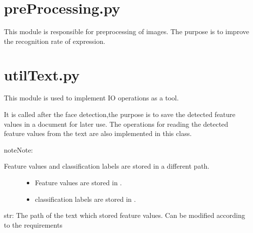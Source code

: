\documentclass[letterpaper,10pt,english]{sphinxmanual}
\begin{document}
\section{preProcessing.py}
\label{Documentation of Code:preprocessing-py}
This module is responsible for preprocessing of images. The purpose is to improve the recognition rate of expression.


\section{utilText.py}
\label{Documentation of Code:utiltext-py}\label{Documentation of Code:module-dataSet.utilText}
This module is used to implement IO operations as a tool.

It is called after the face detection,the purpose is to save the detected feature values in a document for later use.
The operations for reading the detected feature values from the text are also implemented in this class.

\begin{notice}{note}{Note:}\begin{description}
\item[{Feature values and classification labels are stored in a different path.}] \leavevmode\begin{itemize}
\item {} 
Feature values are stored in .

\item {} 
classification labels are stored in .

\end{itemize}

\end{description}
\end{notice}

\begin{fulllineitems}
\label{Documentation of Code:dataSet.utilText.feature_values_path}
str: The path of the text which stored feature values.
Can be modified according to the requirements

\end{fulllineitems}
\end{document}
